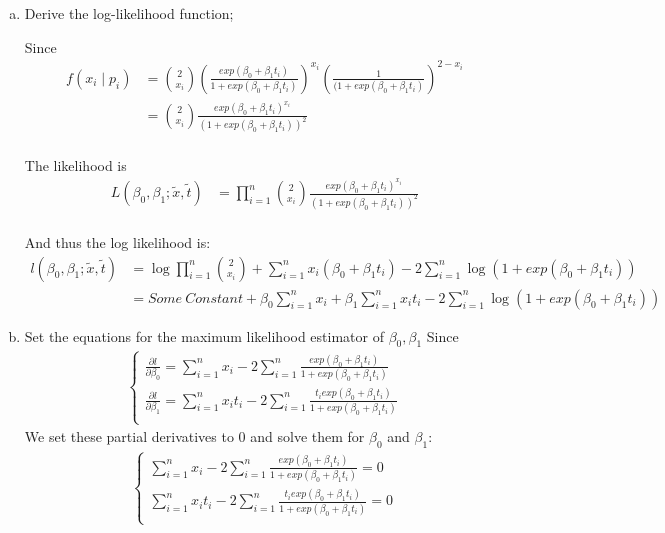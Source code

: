 \documentclass[12pt]{article}
\begin{document}
 \begin{enumerate}[(a)]
\item Derive the log-likelihood function;

Since
\begin{align*}
f(x_i \mid p_i) &= {2 \choose x_i} \left(\frac{ exp(\beta_0 + \beta_1 t_i) } { 1 +  exp(\beta_0 + \beta_1 t_i)} \right)^{x_i}     \left( \frac{1} { ( 1 +  exp(\beta_0 + \beta_1 t_i) } \right)^{2 - x_i} \\
&=  {2 \choose x_i}  \frac{ exp(\beta_0 + \beta_1 t_i)^{x_i} } { (1 +  exp(\beta_0 + \beta_1 t_i) )^2} \\
\end{align*}

The likelihood is
\begin{align*}
L(\beta_0, \beta_1 ; \tilde x, \tilde t) &= \prod_{i=1}^n {2 \choose x_i} \frac{ exp(\beta_0 + \beta_1 t_i)^{x_i} } { (1 +  exp(\beta_0 + \beta_1 t_i) )^{2}} \\
\end{align*}

And thus the log likelihood is:
\begin{align*}
l(\beta_0, \beta_1  ; \tilde x, \tilde t) &= \log \prod_{i=1}^n {2 \choose x_i} +  \sum_{i=1}^n x_i (\beta_0 + \beta_1 t_i) - 2 \sum_{i=1}^n \log (1 + exp(\beta_0 + \beta_1 t_i) ) \\
&= Some \ Constant +  \beta_0 \sum_{i=1}^n x_i   + \beta_1 \sum_{i=1}^n x_i t_i - 2  \sum_{i=1}^n \log (1 + exp(\beta_0 + \beta_1 t_i) )
\end{align*}


\item  Set the equations for the maximum likelihood estimator of $\beta_0, \beta_1$
Since
\begin{align*}
    \begin{cases} 
         \frac {\partial l} {\partial \beta_0} = \sum_{i=1}^n x_i - 2 \sum_{i=1}^n \frac{ exp(\beta_0 + \beta_1 t_i) } {1 + exp(\beta_0 + \beta_1 t_i) }\\
         \frac {\partial l} {\partial \beta_1} = \sum_{i=1}^n x_i t_i - 2 \sum_{i=1}^n \frac{ t_i exp(\beta_0 + \beta_1 t_i) } {1 + exp(\beta_0 + \beta_1 t_i) }\\
    \end{cases}
\end{align*}
We set these partial derivatives to 0 and solve them for $\beta_0$ and $\beta_1$:
\begin{align*}
    \begin{cases} 
         \sum_{i=1}^n x_i - 2 \sum_{i=1}^n \frac{ exp(\beta_0 + \beta_1 t_i) } {1 + exp(\beta_0 + \beta_1 t_i) } = 0\\
         \sum_{i=1}^n x_i t_i - 2 \sum_{i=1}^n \frac{ t_i exp(\beta_0 + \beta_1 t_i) } {1 + exp(\beta_0 + \beta_1 t_i) } = 0\\
    \end{cases}
\end{align*}


\end{enumerate}
\end{document}
